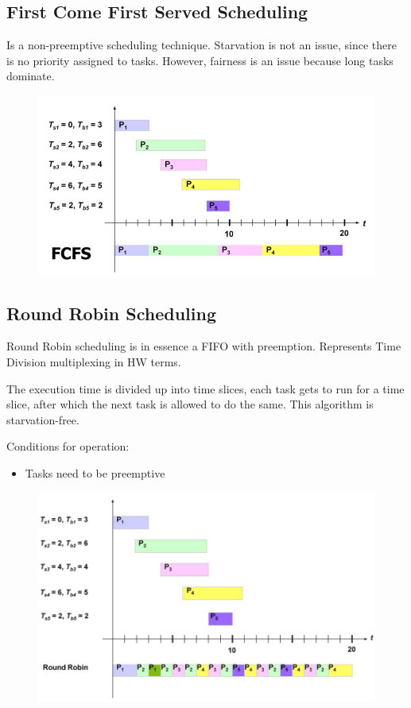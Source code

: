 	\subsection{First Come First Served Scheduling}
		Is a non-preemptive scheduling technique. Starvation is not an issue, since there is no priority assigned to tasks. However, fairness is an issue because long tasks dominate.
		\begin{figure}[H]\centering
			\includegraphics[scale=0.6]{./pictures/firstComeFirstServe.png}
		\end{figure}
			
	\subsection{Round Robin Scheduling}
		Round Robin scheduling is in essence a FIFO with preemption. Represents Time Division multiplexing in HW terms.
		
		The execution time is divided up into time slices, each task gets to run for a time slice, after which the next task is allowed to do the same. This algorithm is starvation-free.

		Conditions for operation:
		\begin{itemize}
		  \item Tasks need to be preemptive
		\end{itemize}
		
		\begin{figure}[H]\centering
			\includegraphics[scale=0.6]{./pictures/roundRobin.png}
		\end{figure}
		
